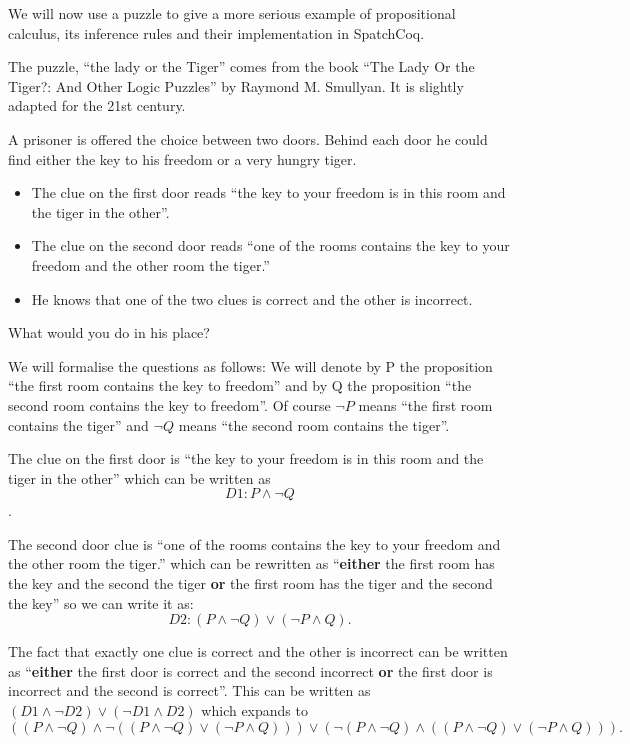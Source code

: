We will now use a puzzle to give a more serious example	 of propositional calculus, its inference rules and their implementation in SpatchCoq. 

The puzzle, ``the lady or the Tiger'' comes from the book  ``The Lady Or the Tiger?: And Other Logic Puzzles'' by Raymond M. Smullyan. It is slightly adapted for the 21st century.

A  prisoner is offered the choice between two doors. Behind each door he could find either the key to his freedom or a very hungry tiger.

 \begin{itemize}

 \item The clue on the first door reads ``the key to your freedom  is in this room and the tiger in the other''.
 \item The clue on the second door reads ``one of the rooms contains  the key to your freedom and the other room the tiger.''
  \item He knows that one of the two clues is correct and the other is incorrect.
 \end{itemize}

What would you do in his place?

We will formalise the questions as follows: We will denote by P the proposition  ``the first room contains the key to freedom'' and by Q the proposition ``the second room contains the key to freedom''. Of course $\neg P$ means ``the first room contains the tiger'' and  $\neg Q$ means ``the second room contains the tiger''.

The clue on the first door is ``the key to your freedom  is in this room and the tiger in the other'' which can be written as $$D1:P\land \neg Q$$.

The second door clue is ``one of the rooms contains  the key to your freedom and the other room the tiger.'' which can be rewritten as ``{\bf either} the first room has the key and the second the tiger {\bf or} the first room has the tiger and the second the key'' so we can write it as:
 $$D2 : (P\land \neg Q) \lor (\neg P \land Q).$$ 
 
 The fact that exactly one clue is correct and the other is incorrect can be written as ``{\bf either} the first door is correct and the second incorrect {\bf or} the first door is incorrect and the second is correct''. This can be written as $(D1 \land \neg D2 )\lor (\neg D1 \land D2)$ which expands to $$((P\land \neg Q)\land \neg ((P\land \neg Q) \lor (\neg P \land Q)))\lor (\neg(P\land \neg Q) \land ((P\land \neg Q) \lor (\neg P \land Q))).$$ 

